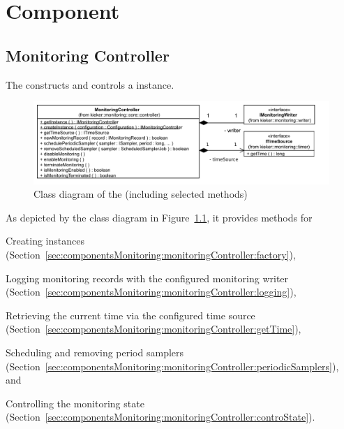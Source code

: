 %


\chapter{\KiekerMonitoringPart{} Component}\label{chap:componentsMonitoring}


\section{Monitoring Controller}\label{sec:componentsMonitoring:monitoringController}

The  constructs and controls a \KiekerMonitoringPart{} %
instance.

\enlargethispage{1cm}

\begin{figure}[h]\centering %
\includegraphics[scale=0.7]{images/kieker_monitoringControlleruserguide-simplified}
\caption{Class diagram of the  (including selected methods)}
\label{fig:monitoringController:classdiagram}
\end{figure}

As depicted by the class diagram in Figure~\ref{fig:monitoringController:classdiagram}, it provides methods for\\

\begin{compactitem}
 \item Creating  instances (Section~\ref{sec:componentsMonitoring:monitoringController:factory}),
 \item Logging monitoring records with the configured monitoring writer (Section~\ref{sec:componentsMonitoring:monitoringController:logging}),
 \item Retrieving the current time via the configured time source (Section~\ref{sec:componentsMonitoring:monitoringController:getTime}),
 \item Scheduling and removing period samplers (Section~\ref{sec:componentsMonitoring:monitoringController:periodicSamplers}), and
 \item Controlling the monitoring state (Section~\ref{sec:componentsMonitoring:monitoringController:controState}).
\end{compactitem}


